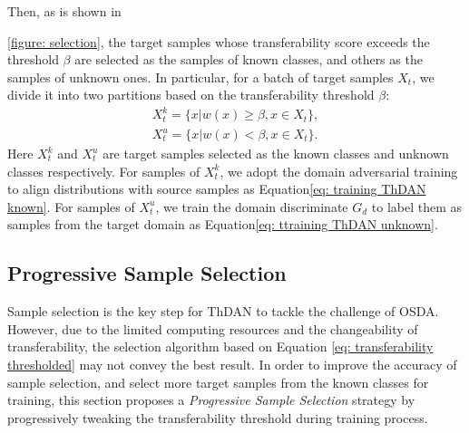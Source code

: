 Then, as is shown in \figurename{\ref{figure: selection}, the target samples whose transferability score exceeds the threshold $\beta$ are selected as the samples of known classes, and others as the samples of unknown ones. 
In particular, for a batch of target samples $X_t$, we divide it into two partitions based on the transferability threshold $\beta$: 
\begin{equation}
    \label{eq: split target examples}
    \begin{split}
        X_t^k=\{x|w(x) \geq \beta, x \in X_t \}, \\
        X_t^u=\{x|w(x) < \beta, x \in X_t \}.
    \end{split}
\end{equation}
Here $X_t^k$ and $X_t^u$ are target samples selected as the known classes and unknown classes respectively.
For samples of $X_t^k$, we adopt the domain adversarial training to align distributions with source samples as Equation\ref{eq: training ThDAN known}.
For samples of $X_t^u$, we train the domain discriminate $G_d$ to label them as samples from the target domain as Equation\ref{eq: ttraining ThDAN unknown}.

\subsection{Progressive Sample Selection}
\label{Section : Progressive Sample Selection}
Sample selection is the key step for ThDAN to tackle the challenge of OSDA. 
However, due to the limited computing resources and the changeability of transferability, the selection algorithm based on Equation \ref{eq: transferability thresholded} may not convey the best result. 
In order to improve the accuracy of sample selection, and select more target samples from the known classes for training, this section proposes a \textit{Progressive Sample Selection} strategy by progressively tweaking the transferability threshold during training process. 

}
